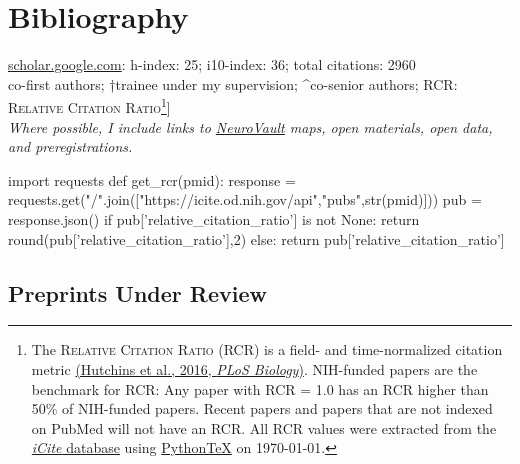 \documentclass[11pt, letterpaper]{article}
\newcommand{\pytex}{Python\TeX}
\begin{document}
\pagebreak
\section*{Bibliography}
\aiGoogleScholar \hspace{.01cm} \href{https://scholar.google.com/citations?user=czV7OcQAAAAJ&hl=en}{scholar.google.com}: h-index: 25; i10-index: 36; total citations: 2960 \\ 
\lbrack*co-first authors; †trainee under my supervision; \^{}co-senior authors; RCR: \textsc{Relative Citation Ratio}\footnote{The \textsc{Relative Citation Ratio} (RCR) is a field- and time-normalized citation metric \href{http://journals.plos.org/plosbiology/article?id=10.1371/journal.pbio.1002541}{(Hutchins et al., 2016, \textit{PLoS Biology})}. NIH-funded papers are the benchmark for RCR: Any paper with RCR = 1.0 has an RCR higher than 50\% of NIH-funded papers. Recent papers and papers that are not indexed on PubMed will not have an RCR. All RCR values were extracted from the \href{https://icite.od.nih.gov/stats}{\textit{iCite} database} using \href{https://github.com/gpoore/pythontex}{\pytex} on \today.}] \\ 

\textit{Where possible, I include links to \href{https://neurovault.org}{NeuroVault} maps, open materials, open data, and preregistrations.}


\begin{pycode}
import requests
def get_rcr(pmid):
  response = requests.get("/".join(["https://icite.od.nih.gov/api","pubs",str(pmid)]))
  pub = response.json()
  if pub['relative_citation_ratio'] is not None:
    return round(pub['relative_citation_ratio'],2)
  else:
    return pub['relative_citation_ratio']
\end{pycode}


\subsection*{Preprints Under Review}
\end{document}
